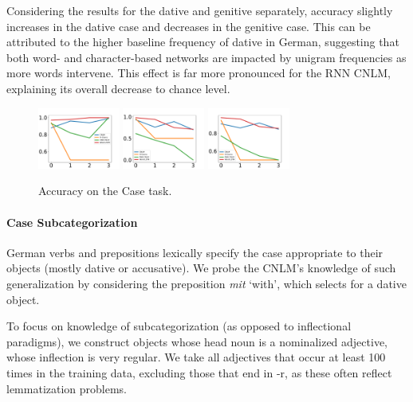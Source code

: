 Considering the results for the dative and genitive separately, accuracy slightly increases in the dative case and decreases in the genitive case.
This can be attributed to the higher baseline frequency of dative in German, suggesting that both word- and character-based networks are impacted by unigram frequencies as more words intervene.
This effect is far more pronounced for the RNN CNLM, explaining its overall decrease to chance level.
\begin{figure}
\includegraphics[width=0.24\textwidth]{figures/german-case-Dative.pdf}
\includegraphics[width=0.24\textwidth]{figures/german-case-Genitive.pdf}
\includegraphics[width=0.24\textwidth]{figures/german-case-total.pdf}
\caption{Accuracy on the Case task.}\label{fig:case}
\end{figure}

\paragraph{Case Subcategorization}
German verbs and prepositions lexically specify the case appropriate to their objects (mostly dative or accusative).
We probe the CNLM's knowledge of such generalization by considering the preposition \textit{mit} `with', which selects for a dative object.

To focus on knowledge of subcategorization (as opposed to inflectional paradigms), we construct objects whose head noun is a nominalized adjective, whose inflection is very regular.
We take all adjectives that occur at least 100 times in the training data, excluding those that end in -r, as these often reflect lemmatization problems.

